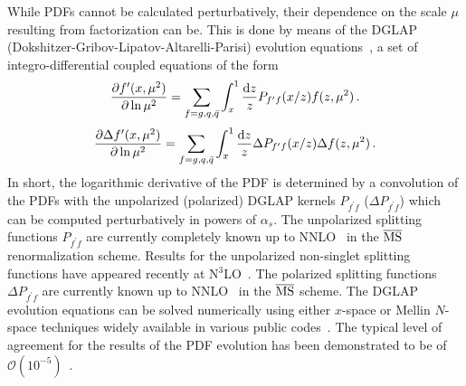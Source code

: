While PDFs cannot be calculated perturbatively, their dependence on the scale 
$\mu$ resulting from factorization can be.
%
This is done by means of the
DGLAP (Dokshitzer-Gribov-Lipatov-Altarelli-Parisi) 
evolution equations~\cite{Dokshitzer:1977sg,Gribov:1972ri,Altarelli:1977zs},
a set of integro-differential coupled equations of the form
\begin{equation}
  \label{eq:dglap}
\frac{\partial f^\prime(x,\mu^2)}{\partial \ln \mu^2}
=
\sum_{f=g,q,\bar{q}}\int_x^1 
\frac{{\rm d}z}{z}P_{f^\prime f}(x/z)f(z,\mu^2)\, .
\end{equation}
%
\begin{equation}
  \label{eq:dglap}
\frac{\partial \Delta f^\prime(x,\mu^2)}{\partial \ln \mu^2}
=
\sum_{f=g,q,\bar{q}}\int_x^1 
\frac{{\rm d}z}{z}\Delta P_{f^\prime f}(x/z)\Delta f(z,\mu^2)\, .
\end{equation}
%
In short, the logarithmic derivative of the PDF is determined by a convolution
of the PDFs with the unpolarized (polarized) DGLAP kernels $P_{f^\prime f}$
($\Delta P_{f^\prime f}$) which can be 
computed perturbatively in powers of $\alpha_{s}$.
%
The unpolarized splitting functions $P_{f^\prime f}$ are currently completely 
known up to NNLO~\cite{mvvns,Vogt:2004mw} in the $\overline{\rm MS}$ 
renormalization scheme.
%
Results for the unpolarized non-singlet splitting functions have appeared 
recently at N$^3$LO~\cite{Davies:2016jie,Moch:2017uml}.
%
The polarized splitting functions $\Delta P_{f^\prime f}$ are currently known 
up to  NNLO~\cite{Moch:2014sna} in the $\overline{\rm MS}$ scheme.
%
The DGLAP evolution equations can be solved numerically using
either $x$-space or Mellin $N$-space techniques widely available in various
public codes~\cite{Vogt:2004ns,Salam:2008qg,Botje:2010ay,
Bertone:2013vaa,Bertone:2015cwa}.
%
The typical level of agreement for the results of the PDF evolution 
has been demonstrated to be of 
$\mathcal{O}(10^{-5})$~\cite{Giele:2002hx,Dittmar:2005ed}.

%
%
%
%

